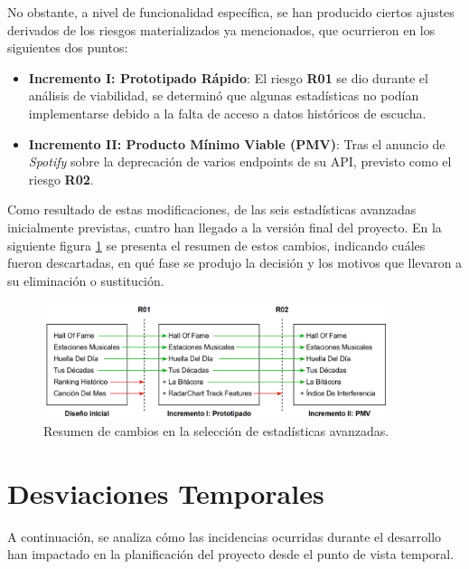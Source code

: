 No obstante, a nivel de funcionalidad específica, se han producido ciertos ajustes derivados de los riesgos materializados ya mencionados, que ocurrieron en los siguientes dos puntos:

\begin{itemize}
    \item \textbf{Incremento I: Prototipado Rápido}:  El riesgo \textbf{R01} se dio durante el análisis de viabilidad, se determinó que algunas estadísticas no podían implementarse debido a la falta de acceso a datos históricos de escucha.
    \item \textbf{Incremento II: Producto Mínimo Viable (PMV)}: Tras el anuncio de \textit{Spotify} sobre la deprecación de varios endpoints de su API, previsto como el riesgo \textbf{R02}.
\end{itemize}

Como resultado de estas modificaciones, de las seis estadísticas avanzadas inicialmente previstas, cuatro han llegado a la versión final del proyecto. En la siguiente figura \ref{fig:estadisticas_cambio} se presenta el resumen de estos cambios, indicando cuáles fueron descartadas, en qué fase se produjo la decisión y los motivos que llevaron a su eliminación o sustitución.

\begin{figure}[H]
    \centering
    \includegraphics[width=0.9\textwidth]{figures/syc/estadisticas_cambio.png}
    \vspace{0.5cm}
    \caption{Resumen de cambios en la selección de estadísticas avanzadas.}
    \label{fig:estadisticas_cambio}
\end{figure}

\newpage

\section{Desviaciones Temporales}

A continuación, se analiza cómo las incidencias ocurridas durante el desarrollo han impactado en la planificación del proyecto desde el punto de vista temporal.

